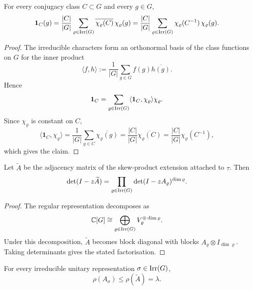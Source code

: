 \begin{proposition}
  \label{prop:class-indicator-expansion}
  For every conjugacy class \(C\subset G\) and every \(g\in G\),
  \[
    \mathbf 1_C(g)
    =\frac{|C|}{|G|}
      \sum_{\varrho\in\operatorname{Irr}(G)}
        \overline{\chi_\varrho(C)}\,\chi_\varrho(g)
    =\frac{|C|}{|G|}
      \sum_{\varrho\in\operatorname{Irr}(G)}
        \chi_\varrho(C^{-1})\,\chi_\varrho(g).
  \]
\end{proposition}

\begin{proof}
  The irreducible characters form an orthonormal basis of the class
  functions on \(G\) for the inner product
  \[
    \langle f,h\rangle
    :=\frac{1}{|G|}\sum_{g\in G}f(g)\overline{h(g)}.
  \]
  Hence
  \[
    \mathbf 1_C
    =\sum_{\varrho\in\operatorname{Irr}(G)}
      \langle \mathbf 1_C,\chi_\varrho\rangle \chi_\varrho.
  \]
  Since \(\chi_\varrho\) is constant on \(C\),
  \[
    \langle \mathbf 1_C,\chi_\varrho\rangle
    =\frac{1}{|G|}\sum_{g\in C}\overline{\chi_\varrho(g)}
    =\frac{|C|}{|G|}\overline{\chi_\varrho(C)}
    =\frac{|C|}{|G|}\chi_\varrho(C^{-1}),
  \]
  which gives the claim.
\end{proof}

\begin{proposition}
  \label{prop:kernel-peter-weyl-block-diagonalisation}
  Let \(\widetilde A\) be the adjacency matrix of the skew-product
  extension attached to \(\tau\). Then
  \[
    \det(I-z\widetilde A)
    =
    \prod_{\varrho\in\operatorname{Irr}(G)}
      \det(I-zA_\varrho)^{\dim\varrho}.
  \]
\end{proposition}

\begin{proof}
  The regular representation decomposes as
  \[
    \mathbb{C}[G]
    \cong
    \bigoplus_{\varrho\in\operatorname{Irr}(G)}
      V_\varrho^{\oplus \dim\varrho}.
  \]
  Under this decomposition, \(\widetilde A\) becomes block diagonal with
  blocks \(A_\varrho\otimes I_{\dim\varrho}\). Taking determinants gives
  the stated factorisation.
\end{proof}

\begin{proposition}
  \label{prop:twisted-spectral-radius-bound}
  For every irreducible unitary representation
  \(\sigma\in\operatorname{Irr}(G)\),
  \[
    \rho(A_\sigma)\le \rho(\widetilde A)=\lambda.
  \]
\end{proposition}

